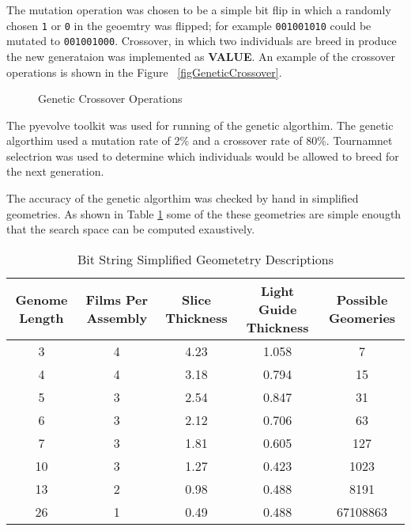 The mutation operation was chosen to be a simple bit flip in which a randomly chosen \verb+1+ or \verb+0+ in the geoemtry was flipped; for example \verb+001001010+ could be mutated to \verb+001001000+.
Crossover, in which two individuals are breed in produce the new generataion was implemented as \textbf{VALUE}.
An example of the crossover operations is shown in the Figure ~\ref{figGeneticCrossover}.
\begin{figure}
    \caption{Genetic Crossover Operations}
    \label{fig:GeneticCrossover}
\end{figure}

The pyevolve toolkit was used for running of the genetic algorthim.
The genetic algorthim used a mutation rate of 2\% and a crossover rate of 80\%.
Tournamnet selectrion was used to determine which individuals would be allowed to breed for the next generation.

The accuracy of the genetic algorthim was checked by hand in simplified geometries.
As shown in Table \ref{tab:BitStringGeo} some of the these geometries are simple enougth that the search space can be computed exaustively.
\begin{table}
    \caption{Bit String Simplified Geometetry Descriptions}
    \label{tab:BitStringGeo}
    \centering
    \begin{tabular}{ c | c c c c}
        Genome Length&Films Per Assembly&Slice Thickness&Light Guide Thickness&Possible Geomeries \\
        \hline
        \hline
        3&4&4.23&1.058&7 \\
        4&4&3.18&0.794&15 \\
        5&3&2.54&0.847&31 \\
        6&3&2.12&0.706&63 \\
        7&3&1.81&0.605&127 \\ 
        \hline
        10&3&1.27&0.423&1023 \\
        \hline
        13&2&0.98&0.488&8191 \\
        26&1&0.49&0.488&67108863 \\
    \end{tabular}
\end{table}


